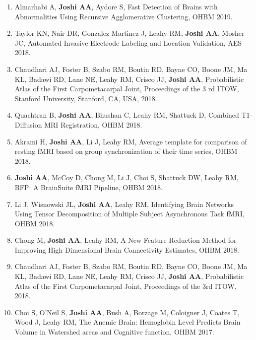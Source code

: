 \documentclass[overlapped,line,letterpaper]{res}
\begin{document}
\begin{resume}
\begin{enumerate}
    \item Almarhabi A, \textbf{Joshi AA}, Aydore S, {Fast Detection of Brains with Abnormalities Using Recursive Agglomerative Clustering}, OHBM 2019.

    \item Taylor KN, Nair DR, Gonzalez-Martinez J, Leahy RM, \textbf{Joshi AA}, Mosher JC, {Automated Invasive Electrode Labeling and Location Validation}, AES 2018. 

    \item Chaudhari AJ, Foster B, Szabo RM, Boutin RD, Bayne CO, Boone JM, Ma KL, Badawi RD, Lane NE, Leahy RM, Crisco JJ, \textbf{Joshi AA}, {Probabilistic Atlas of the First Carpometacarpal Joint}, Proceedings of the 3 rd ITOW, Stanford University, Stanford, CA, USA, 2018.

    \item Quachtran B, \textbf{Joshi AA}, Bhushan C, Leahy RM, Shattuck D, {Combined T1-Diffusion MRI Registration}, OHBM 2018.

    \item Akrami H, \textbf{Joshi AA}, Li J, Leahy RM, {Average template for comparison of resting fMRI based on group synchronization of their time series}, OHBM 2018.

    \item \textbf{Joshi AA}, McCoy D, Chong M, Li J, Choi S, Shattuck DW, Leahy RM, {BFP: A BrainSuite fMRI Pipeline}, OHBM 2018.

    \item Li J, Wisnowski JL, \textbf{Joshi AA}, Leahy RM, {Identifying Brain Networks Using Tensor Decomposition of Multiple Subject Asynchronous Task fMRI}, OHBM 2018.

    \item Chong M, \textbf{Joshi AA}, Leahy RM, {A New Feature Reduction Method for Improving High Dimensional Brain Connectivity Estimates}, OHBM 2018.

    \item Chaudhari AJ, Foster B, Szabo RM, Boutin RD, Bayne CO, Boone JM, Ma KL, Badawi RD, Lane NE, Leahy RM, Crisco JJ, \textbf{Joshi AA}, {Probabilistic Atlas of the First Carpometacarpal Joint}, Proceedings of the 3rd ITOW, 2018.

    \item Choi S, O'Neil S, \textbf{Joshi AA}, Bush A, Borzage M, Coloigner J, Coates T, Wood J, Leahy RM, {The Anemic Brain: Hemoglobin Level Predicts Brain Volume in Watershed areas and Cognitive function}, OHBM 2017.


\end{enumerate}
\end{resume}
\end{document}
